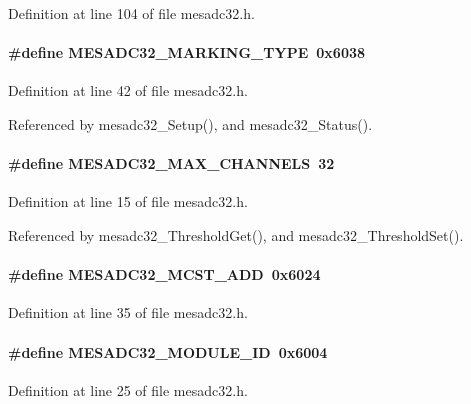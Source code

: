 Definition at line 104 of file mesadc32.h.
\paragraph[{MESADC32\_\-MARKING\_\-TYPE}]{\setlength{\rightskip}{0pt plus 5cm}\#define MESADC32\_\-MARKING\_\-TYPE~0x6038}\hfill\label{mesadc32_8h_a9ac0251ee74faa27016f91b7d07d15c9}


Definition at line 42 of file mesadc32.h.

Referenced by mesadc32\_\-Setup(), and mesadc32\_\-Status().
\paragraph[{MESADC32\_\-MAX\_\-CHANNELS}]{\setlength{\rightskip}{0pt plus 5cm}\#define MESADC32\_\-MAX\_\-CHANNELS~32}\hfill\label{mesadc32_8h_aac68cde62bec4e89be0c14d969758c3a}


Definition at line 15 of file mesadc32.h.

Referenced by mesadc32\_\-ThresholdGet(), and mesadc32\_\-ThresholdSet().
\paragraph[{MESADC32\_\-MCST\_\-ADD}]{\setlength{\rightskip}{0pt plus 5cm}\#define MESADC32\_\-MCST\_\-ADD~0x6024}\hfill\label{mesadc32_8h_ab13a7a11cf837ee382ff08a1842dab5b}


Definition at line 35 of file mesadc32.h.
\paragraph[{MESADC32\_\-MODULE\_\-ID}]{\setlength{\rightskip}{0pt plus 5cm}\#define MESADC32\_\-MODULE\_\-ID~0x6004}\hfill\label{mesadc32_8h_a9063e4549057b591d5bd4219ecea0eb0}


Definition at line 25 of file mesadc32.h.

